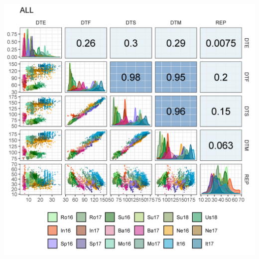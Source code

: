 \documentclass[
]{article}
\begin{document}
\includegraphics{Additional/Corr/Corr_All.png}
\end{document}

